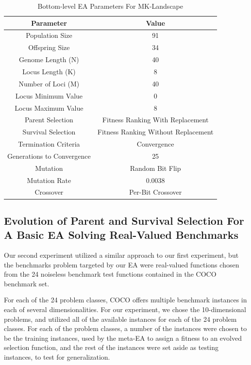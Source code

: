 \documentclass[sigconf]{acmart}
\begin{document}
\begin{table} 
	\centering
	\caption{Bottom-level EA Parameters For MK-Landscape}
	\label{tab:Bottom-level EA Parameters For MK-Landscape}
	\begin{tabular}{c|c}
		\toprule
		Parameter & Value\\
		\midrule
		Population Size & 91 \\
		\hline
		Offspring Size & 34\\
		\hline
		Genome Length (N) & 40 \\
		\hline
		Locus Length (K) & 8\\
		\hline
		Number of Loci (M) & 40 \\
		\hline
		Locus Minimum Value & 0\\
		\hline
		Locus Maximum Value & 8\\
		\hline
		Parent Selection & Fitness Ranking With Replacement \\
		\hline
		Survival Selection & Fitness Ranking Without Replacement \\
		\hline
		Termination Criteria & Convergence \\
		\hline
		Generations to Convergence & 25\\
		\hline
		Mutation & Random Bit Flip \\
		\hline
		Mutation Rate & 0.0038\\
		\hline
		Crossover & Per-Bit Crossover\\
		
		\bottomrule
	\end{tabular}
\end{table}

\subsection{Evolution of Parent and Survival Selection For A Basic EA Solving Real-Valued Benchmarks}
\label{Evolution of Parent and Survival Selection For A Basic EA Solving Real-Valued Benchmarks}

Our second experiment utilized a similar approach to our first experiment, but the benchmarks problem targeted by our EA were real-valued functions chosen from the 24 noiseless benchmark test functions contained in the COCO benchmark set. 

For each of the 24 problem classes, COCO offers multiple benchmark instances in each of several dimensionalities. For our experiment, we chose the 10-dimensional problems, and utilized all of the available instances for each of the 24 problem classes. For each of the problem classes, a number of the instances were chosen to be the training instances, used by the meta-EA to assign a fitness to an evolved selection function, and the rest of the instances were set aside as testing instances, to test for generalization.
\end{document}
